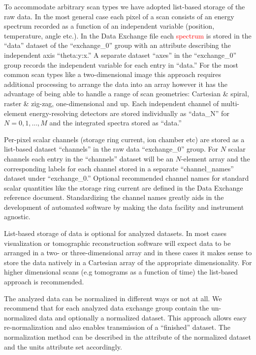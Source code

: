 \documentclass[pdf]{iucr}              %
\begin{document}
To accommodate arbitrary scan types we have adopted list-based storage of the raw data. In the most general case each pixel of a scan consists of an energy spectrum recorded as a function of an independent variable (position, temperature, angle etc.). In the Data Exchange file each \textcolor{red}{spectrum} is stored in the ``data'' dataset of the ``exchange\_0'' group with an attribute describing the independent axis ``theta:y:x.'' A separate dataset ``axes'' in the ``exchange\_0'' group records the independent variable for each entry in ``data.'' For the most common scan types like a two-dimensional image this approach requires additional processing to arrange the data into an array however it has the advantage of being able to handle a range of scan geometries: Cartesian \& spiral, raster \& zig-zag, one-dimensional and up. Each independent channel of multi-element energy-resolving detectors are stored individually as ``data\_N'' for $N=0,1,...,M$ and the integrated spectra stored as ``data.''

Per-pixel scalar channels (storage ring current, ion chamber etc) are stored as a list-based dataset ``channels'' in the raw data ``exchange\_0'' group. For $N$ scalar channels each entry in the ``channels'' dataset will be an $N$-element array and the corresponding labels for each channel stored in a separate ``channel\_names'' dataset under ``exchange\_0.'' Optional recommended channel names for standard scalar quantities like the storage ring current are defined in the Data Exchange reference document. Standardizing the channel names greatly aids in the development of automated software by making the data facility and instrument agnostic. 

List-based storage of data is optional for analyzed datasets. In most cases visualization or tomographic reconstruction software will expect data to be arranged in a two- or three-dimensional array and in these cases it makes sense to store the data natively in a Cartesian array of the appropriate dimensionality. For higher dimensional scans (e.g tomograms as a function of time) the list-based approach is recommended.

The analyzed data can be normalized in different ways or not at all. We recommend that for each analyzed data exchange group contain the un-normalized data and optionally a normalized dataset. This approach allows easy re-normalization and also enables transmission of a ``finished'' dataset. The normalization method can be described in the attribute of the normalized dataset and the units attribute set accordingly.
\end{document}
